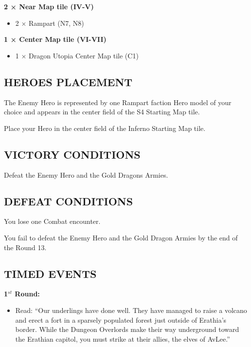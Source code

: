 \begin{multicols*}{2}
\textbf{2 × Near Map tile (IV-V)}
\begin{itemize}
  \item 2 × Rampart (N7, N8)
\end{itemize}

\textbf{1 × Center Map tile (VI-VII)}
\begin{itemize}
  \item 1 × Dragon Utopia Center Map tile (C1)
\end{itemize}

\subsection*{\MakeUppercase{Heroes placement}}

The Enemy Hero is represented by one Rampart faction Hero model of your choice
and appears in the center field of the S4 Starting Map tile.

Place your Hero in the center field of the Inferno Starting Map tile.

\subsection*{\MakeUppercase{Victory Conditions}}

Defeat the Enemy Hero and the Gold Dragons Armies.

\subsection*{\MakeUppercase{Defeat Conditions}}

You lose one Combat encounter.

You fail to defeat the Enemy Hero and the Gold Dragon Armies by the end of the Round 13.

\subsection*{\MakeUppercase{Timed Events}}

\textbf{1$^{st}$ Round:}
\begin{itemize}
  \item Read: ``Our underlings have done well. They have managed to raise a volcano
    and erect a fort in a sparsely populated forest just outside of Erathia's border.
    While the Dungeon Overlords make their way underground toward the Erathian capitol,
    you must strike at their allies, the elves of AvLee.''
\end{itemize}


\end{multicols*}
